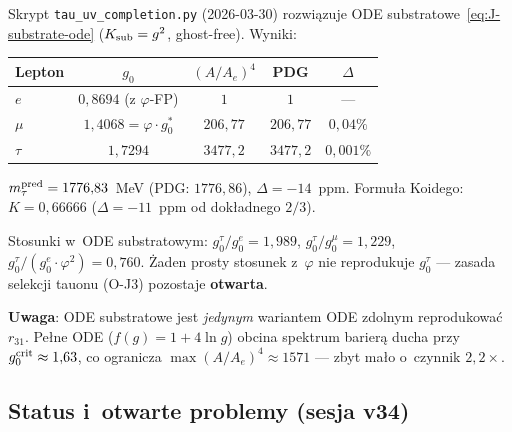 \begin{remark}%
\label{rem:K-substrate-tau}
Skrypt \texttt{tau\_uv\_completion.py} (2026-03-30) rozwiązuje ODE
substratowe~\eqref{eq:J-substrate-ode} ($K_{\rm sub} = g^2$, ghost-free).
Wyniki:
\begin{center}\footnotesize
\begin{tabular}{@{}lcccc@{}}
\toprule
  Lepton & $g_0$ & $(A/A_e)^4$ & PDG & $\Delta$ \\
\midrule
  $e$ & $0{,}8694$ (z $\varphi$-FP) & $1$ & $1$ & --- \\
  $\mu$ & $1{,}4068 = \varphi\cdot g_0^*$ & $206{,}77$ & $206{,}77$ & $0{,}04\%$ \\
  $\tau$ & $1{,}7294$ & $3477{,}2$ & $3477{,}2$ & $0{,}001\%$ \\
\bottomrule
\end{tabular}
\end{center}
$m_\tau^{\rm pred} = 1776{,}83$~MeV (PDG: $1776{,}86$), $\Delta = -14$~ppm.
Formuła Koidego: $K = 0{,}66666$ ($\Delta = -11$~ppm od dokładnego $2/3$).

Stosunki w~ODE substratowym:
$g_0^\tau/g_0^e = 1{,}989$, $g_0^\tau/g_0^\mu = 1{,}229$, $g_0^\tau/(g_0^e\cdot\varphi^2) = 0{,}760$.
Żaden prosty stosunek z~$\varphi$ nie reprodukuje $g_0^\tau$ --- zasada
selekcji tauonu (O-J3) pozostaje \textbf{otwarta}.

\textbf{Uwaga}: ODE substratowe jest \emph{jedynym} wariantem ODE zdolnym
reprodukować $r_{31}$. Pełne ODE ($f(g) = 1+4\ln g$) obcina spektrum barierą
ducha przy $g_0^{\rm crit} \approx 1{,}63$, co ogranicza $\max(A/A_e)^4 \approx 1571$
--- zbyt mało o~czynnik $2{,}2\times$.
\end{remark}

\subsection{Status i~otwarte problemy (sesja v34)}%
\label{app:K-status}

